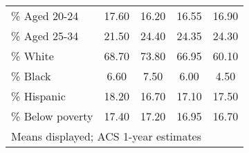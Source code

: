\begin{table}[htbp]
\begin{adjustbox}{max width=\linewidth}
\begin{tabular}{l*{4}{c}}
\% Aged 20-24       &       17.60&       16.20&       16.55&       16.90\\
\% Aged 25-34       &       21.50&       24.40&       24.35&       24.30\\
\% White            &       68.70&       73.80&       66.95&       60.10\\
\% Black            &        6.60&        7.50&        6.00&        4.50\\
\% Hispanic         &       18.20&       16.70&       17.10&       17.50\\
\% Below poverty    &       17.40&       17.20&       16.95&       16.70\\
\bottomrule
\multicolumn{5}{l}{\footnotesize Means displayed; ACS 1-year estimates}\\
\end{tabular} \end{adjustbox}
\end{table}
